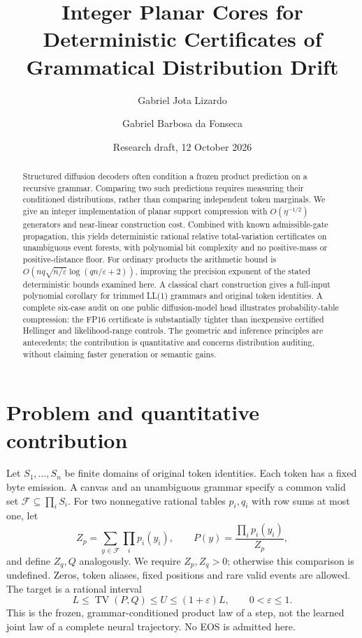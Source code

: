\documentclass[11pt]{article}
\title{Integer Planar Cores for Deterministic Certificates\newline
of Grammatical Distribution Drift}
\author{Gabriel Jota Lizardo\and Gabriel Barbosa da Fonseca}
\date{Research draft, 12 October 2026}
\newcommand{\TV}{\operatorname{TV}}
\begin{document}
\maketitle
\begin{abstract}
Structured diffusion decoders often condition a frozen product prediction on
a recursive grammar. Comparing two such predictions requires measuring their
conditioned distributions, rather than comparing independent token marginals.
We give an integer implementation of planar support compression with
$O(\eta^{-1/2})$ generators and near-linear construction cost. Combined with
known admissible-gate propagation, this yields deterministic rational relative
total-variation certificates on unambiguous event forests, with polynomial
bit complexity and no positive-mass or positive-distance floor. For ordinary
products the arithmetic bound is
$O(nq\sqrt{n/\varepsilon}\log(qn/\varepsilon+2))$, improving the precision
exponent of the stated deterministic bounds examined here. A classical chart
construction gives a full-input polynomial corollary for trimmed LL(1)
grammars and original token identities. A complete six-case audit on one
public diffusion-model head illustrates probability-table compression: the
FP16 certificate is substantially tighter than inexpensive certified
Hellinger and likelihood-range controls. The geometric and inference
principles are antecedents; the contribution is quantitative and concerns
distribution auditing, without claiming faster generation or semantic gains.
\end{abstract}

\section{Problem and quantitative contribution}
Let $S_1,\ldots,S_n$ be finite domains of original token identities. Each token
has a fixed byte emission. A canvas and an unambiguous grammar specify a
common valid set $\mathcal F\subseteq\prod_i S_i$. For two nonnegative rational
tables $p_i,q_i$ with row sums at most one, let
\[
 Z_p=\sum_{y\in\mathcal F}\prod_i p_i(y_i),\qquad
 P(y)=\frac{\prod_i p_i(y_i)}{Z_p},
\]
and define $Z_q,Q$ analogously. We require $Z_p,Z_q>0$; otherwise this comparison
is undefined. Zeros, token aliases, fixed positions and rare valid events are
allowed. The target is a rational interval
\begin{equation}\label{eq:target}
 L\leq\TV(P,Q)\leq U\leq(1+\varepsilon)L,
 \qquad 0<\varepsilon\leq1.
\end{equation}
This is the frozen, grammar-conditioned product law of a step, not the
learned joint law of a complete neural trajectory. No EOS is admitted here.
\end{document}
